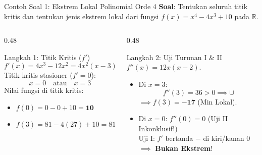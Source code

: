 \documentclass[aspectratio=43,10pt]{beamer}
\begin{document}
\begin{frame}{Contoh Soal 1: Ekstrem Lokal Polinomial Orde 4}
    \textbf{Soal}: Tentukan seluruh titik kritis dan tentukan jenis ekstrem lokal dari fungsi $f(x) = x^4 - 4x^3 + 10$ pada $\mathbb{R}$.

    \pause
    \vspace{0.1cm}
    \begin{columns}[T]
        \begin{column}{0.48\textwidth}
            \begin{block}{Langkah 1: Titik Kritis ($f'$)}
                \[
                    f'(x) = 4x^3 - 12x^2 = 4x^2(x - 3)
                \]
                Titik kritis stasioner ($f'=0$):
                \[
                    x = 0 \quad \text{atau} \quad x = 3
                \]
                Nilai fungsi di titik kritis:
                \begin{itemize}
                    \item $f(0) = 0 - 0 + 10 = \mathbf{10}$
                    \item $f(3) = 81 - 4(27) + 10 = 81 - 108 + 10 = \mathbf{-17}$
                \end{itemize}
            \end{block}
        \end{column}

        \begin{column}{0.48\textwidth}
            \begin{exampleblock}{Langkah 2: Uji Turunan I \& II}
                $f''(x) = 12x(x - 2)$.
                \begin{itemize}
                    \item Di $x = 3$:
                    \[
                        f''(3) = 36 > 0 \implies \cup
                    \]
                    $\implies f(3) = \mathbf{-17}$ (Min Lokal).
                    \item Di $x = 0$: $f''(0) = 0$ \color{CoralRose}(Uji II Inkonklusif!)\\
                    {\scriptsize Uji I: $f'$ bertanda $-$ di kiri/kanan $0$ $\implies$ \textbf{Bukan Ekstrem}!}
                \end{itemize}
            \end{exampleblock}
        \end{column}
    \end{columns}
\end{frame}
\end{document}
